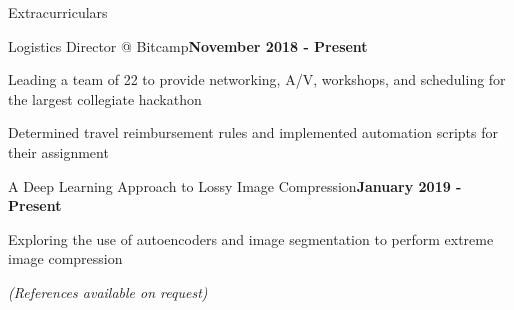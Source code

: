 \documentclass[mm,centered]{resume} %
\begin{document}

\begin{rSection}{Extracurriculars} 

	\begin{rSubsection}{Logistics Director @ Bitcamp}{\textbf{November 2018 - Present}}{}{}
		\item Leading a team of 22 to provide networking, A/V, workshops, and scheduling for the largest collegiate hackathon
		\item Determined travel reimbursement rules and implemented automation scripts for their assignment
	\end{rSubsection}
	
	\begin{rSubsection}{A Deep Learning Approach to Lossy Image Compression}{\textbf{January 2019 - Present}}{}{}
		\item Exploring the use of autoencoders and image segmentation to perform extreme image compression

	\end{rSubsection}


\end{rSection}

\begin{center}
	\vspace{4mm}
	\textit{(References available on request)}
\end{center}
\end{document}
